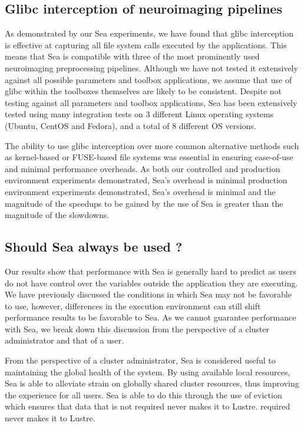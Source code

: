 \documentclass[fleqn,10pt]{wlscirep}
\begin{document}
    \subsection{Glibc interception of neuroimaging pipelines}
    
    As demonstrated by our Sea experiments, we have found that glibc interception
    is effective at capturing all file system calls executed by the
    applications. This means that Sea is compatible with three of the most
    prominently used neuroimaging preprocessing pipelines. Although we have not
    tested it extensively against all possible parameters and toolbox
    applications, we assume that use of glibc within the toolboxes themselves are
    likely to be consistent. Despite not testing against all parameters and
    toolbox applications, Sea has been extensively tested using many integration
    tests on 3 different Linux operating systems (Ubuntu, CentOS and Fedora),
    and a total of 8 different OS versions.

    The ability to use glibc interception over more common alternative methods
    such as kernel-based or FUSE-based file systems was essential in ensuring
    ease-of-use and minimal performance overheads. As both our controlled and
    production environment experiments demonstrated, Sea's overhead is minimal
    production environment experiments demonstrated, Sea's overhead is minimal
    and the magnitude of the speedups to be gained by the use of Sea is
    greater than the magnitude of the slowdowns.
    
    \subsection{Should Sea always be used ?}
    
    Our results show that performance with Sea is generally hard to predict as
    users do not have control over the variables outside the application they
    are executing. We have previously discussed the conditions in which Sea may
    not be favorable to use, however, differences in the execution environment
    can still shift performance results to be favorable to Sea. As we cannot
    guarantee performance with Sea, we break down this discussion from the
    perspective of a cluster administrator and that of a user.

    From the perspective of a cluster administrator, Sea is considered useful to
    maintaining the global health of the system. By using available local
    resources, Sea is able to alleviate strain on globally shared cluster
    resources, thus improving the experience for all users. Sea is able to do
    this through the use of eviction which ensures that data that is not
    required never makes it to Lustre.
    required never makes it to Lustre.
\end{document}
